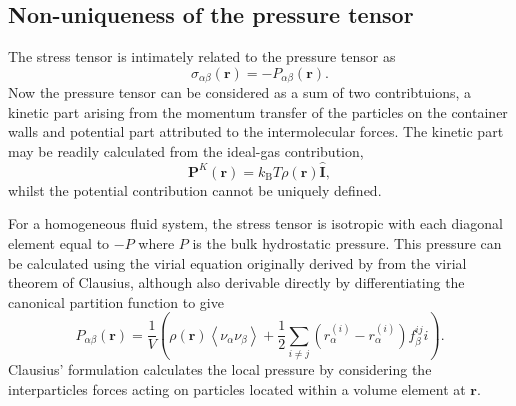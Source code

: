 \subsection{Non-uniqueness of the pressure tensor}
The stress tensor is intimately related to the pressure tensor as
\begin{equation}
\sigma_{\alpha \beta}(\mathbf{r}) = - P_{\alpha \beta} (\mathbf{r}).
\end{equation}
Now the pressure tensor can be considered as a sum of two contribtuions, a kinetic part arising from the momentum transfer of the particles on the container walls and potential part attributed to the intermolecular forces.\cite{VarnikBinder}
The kinetic part may be readily calculated from the ideal-gas contribution,
\begin{equation}
\mathbf{P}^{K}(\mathbf{r})=k_{\mathrm{B}} T \rho(\mathbf{r}) \hat{\mathbf{I}},
\end{equation}
whilst the potential contribution cannot be uniquely defined.

For a homogeneous fluid system, the stress tensor is isotropic with each diagonal element equal to $- P$ where $P$ is the bulk hydrostatic pressure. 
This pressure can be calculated using the virial equation originally derived by from the virial theorem of Clausius\cite{Clausius}, although also derivable directly by differentiating the canonical partition function\cite{MolTheoryCap} to give
\begin{equation}
\label{VirialPressure}
P_{\alpha \beta}(\mathbf{r})=\frac{1}{V} \left( \rho(\mathbf{r})\left< \nu_{\alpha} \nu_{\beta} \right> + \frac{1}{2} \sum_{i \neq j} (r_{\alpha}^{(i)} - r_{\alpha}^{(i)})f_{\beta}^{ij}i \right).
\end{equation}
Clausius' formulation calculates the local pressure by considering the interparticles forces acting on particles located within a volume element at $\mathbf{r}$.

